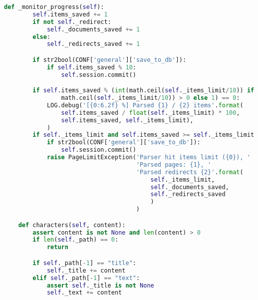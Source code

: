 \begin{lstlisting}[language=Python, caption=XML parser]
    def _monitor_progress(self):
        self.items_saved += 1
        if not self._redirect:
            self._documents_saved += 1
        else:
            self._redirects_saved += 1

        if str2bool(CONF['general']['save_to_db']):
            if self.items_saved % 10:
                self.session.commit()

        if self.items_saved % (int(math.ceil(self._items_limit/10)) if int(
                math.ceil(self._items_limit/10)) > 0 else 1) == 0:
            LOG.debug('[{0:6.2f} %] Parsed {1} / {2} items'.format(
                self.items_saved / float(self._items_limit) * 100,
                self.items_saved, self._items_limit),
            )
        if self._items_limit and self.items_saved >= self._items_limit:
            if str2bool(CONF['general']['save_to_db']):
                self.session.commit()
            raise PageLimitException('Parser hit items limit ({0}), '
                                     'Parsed pages: {1}, '
                                     'Parsed redirects {2}'.format(
                                         self._items_limit,
                                         self._documents_saved,
                                         self._redirects_saved
                                         )
                                     )

    def characters(self, content):
        assert content is not None and len(content) > 0
        if len(self._path) == 0:
            return

        if self._path[-1] == "title":
            self._title += content
        elif self._path[-1] == "text":
            assert self._title is not None
            self._text += content
\end{lstlisting}

